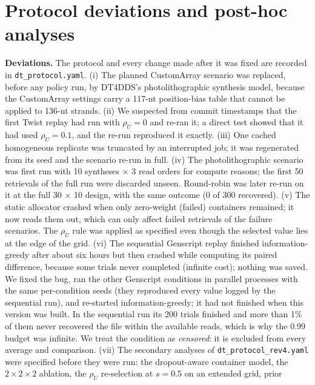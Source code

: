 \documentclass[conference,onecolumn,11pt]{IEEEtran}
\begin{document}
\section{Protocol deviations and post-hoc analyses}\label{app:devfull}
\textbf{Deviations.}  The protocol and every change made after it was fixed are recorded in
\texttt{dt\_protocol.yaml}.  (i) The planned CustomArray scenario was replaced, before any policy run, by
DT4DDS's photolithographic synthesis model, because the CustomArray settings carry a 117-nt
position-bias table that cannot be applied to 136-nt strands.  (ii) We suspected from commit timestamps
that the first Twist replay had run with $\rho_U{=}0$ and re-ran it; a direct test showed that it had
used $\rho_U{=}0.1$, and the re-run reproduced it exactly.  (iii) One cached homogeneous replicate was
truncated by an interrupted job; it was regenerated from its seed and the scenario re-run in full.
(iv) The photolithographic scenario was first run with 10 syntheses $\times$ 3 read orders for compute
reasons; the first 50 retrievals of the full run were discarded unseen.  Round-robin was later re-run on
it at the full 30 $\times$ 10 design, with the same outcome (0 of 300 recovered).  (v) The static
allocator crashed when only zero-weight (failed) containers remained; it now reads them out, which can
only affect failed retrievals of the failure scenarios.  The $\rho_U$ rule was applied as specified even
though the selected value lies at the edge of the grid.  (vi) The sequential Genscript replay finished
information-greedy after about six hours but then crashed while computing its paired difference, because
some trials never completed (infinite cost); nothing was saved.  We fixed the bug, ran the other Genscript
conditions in parallel processes with the same per-condition seeds (they reproduced every value logged by
the sequential run), and re-started information-greedy; it had not finished when this version was built.
In the sequential run its 200 trials finished and more than 1\% of them never recovered the file within
the available reads, which is why the 0.99 budget was infinite.  We treat the condition as
\emph{censored}: it is excluded from every average and comparison.  (vii) The secondary analyses of
\texttt{dt\_protocol\_rev4.yaml} were specified before they were run: the dropout-aware container model,
the $2\times2\times2$ ablation, the $\rho_U$ re-selection at $s{=}0.5$ on an extended grid, prior
\end{document}
